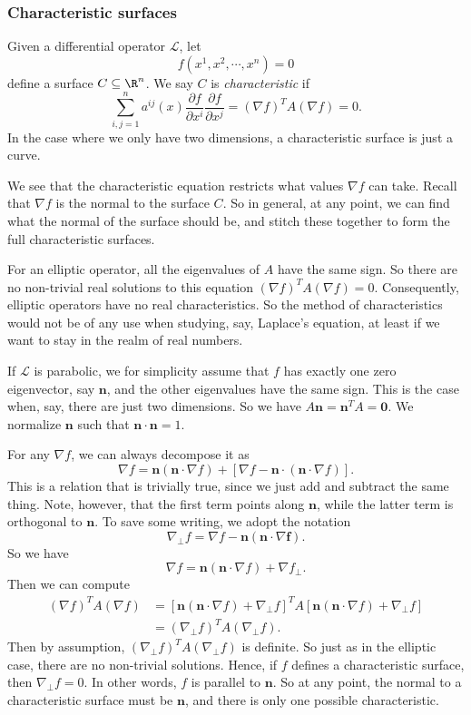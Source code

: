\documentclass[a4paper]{article}
\begin{document}
\subsubsection*{Characteristic surfaces}
\begin{defi}
  Given a differential operator $\mathcal{L}$, let
  \[
    f(x^1, x^2, \cdots, x^n) = 0
  \]
  define a surface $C \subseteq \R^n$. We say $C$ is \emph{characteristic} if
  \[
    \sum_{i, j = 1}^n a^{ij}(x) \frac{\partial f}{\partial x^i} \frac{\partial f}{\partial x^j} = (\nabla f)^T A (\nabla f) = 0.
  \]
  In the case where we only have two dimensions, a characteristic surface is just a curve.
\end{defi}
We see that the characteristic equation restricts what values $\nabla f$ can take. Recall that $\nabla f$ is the normal to the surface $C$. So in general, at any point, we can find what the normal of the surface should be, and stitch these together to form the full characteristic surfaces.

For an elliptic operator, all the eigenvalues of $A$ have the same sign. So there are no non-trivial real solutions to this equation $(\nabla f)^T A (\nabla f) = 0$. Consequently, elliptic operators have no real characteristics. So the method of characteristics would not be of any use when studying, say, Laplace's equation, at least if we want to stay in the realm of real numbers.

If $\mathcal{L}$ is parabolic, we for simplicity assume that $f$ has exactly one zero eigenvector, say $\mathbf{n}$, and the other eigenvalues have the same sign. This is the case when, say, there are just two dimensions. So we have $A \mathbf{n} = \mathbf{n}^T A = \mathbf{0}$. We normalize $\mathbf{n}$ such that $\mathbf{n}\cdot \mathbf{n} = 1$.

For any $\nabla f$, we can always decompose it as
\[
  \nabla f = \mathbf{n} (\mathbf{n} \cdot \nabla f) + [\nabla f - \mathbf{n}\cdot (\mathbf{n}\cdot \nabla f)].
\]
This is a relation that is trivially true, since we just add and subtract the same thing. Note, however, that the first term points along $\mathbf{n}$, while the latter term is orthogonal to $\mathbf{n}$. To save some writing, we adopt the notation
\[
  \nabla_\perp f = \nabla f - \mathbf{n}(\mathbf{n} \cdot \nabla \mathbf{f}).
\]
So we have
\[
  \nabla f = \mathbf{n}(\mathbf{n}\cdot \nabla f) + \nabla f_\perp.
\]
Then we can compute
\begin{align*}
  (\nabla f)^T A(\nabla f) &= [\mathbf{n}(\mathbf{n}\cdot \nabla f) + \nabla_\perp f]^T A[\mathbf{n}(\mathbf{n}\cdot \nabla f) + \nabla_\perp f]\\
  &= (\nabla_\perp f)^T A(\nabla_\perp f).
\end{align*}
Then by assumption, $(\nabla_\perp f)^T A(\nabla_\perp f)$ is definite. So just as in the elliptic case, there are no non-trivial solutions. Hence, if $f$ defines a characteristic surface, then $\nabla_\perp f = 0$. In other words, $f$ is parallel to $\mathbf{n}$. So at any point, the normal to a characteristic surface must be $\mathbf{n}$, and there is only one possible characteristic.
\end{document}
